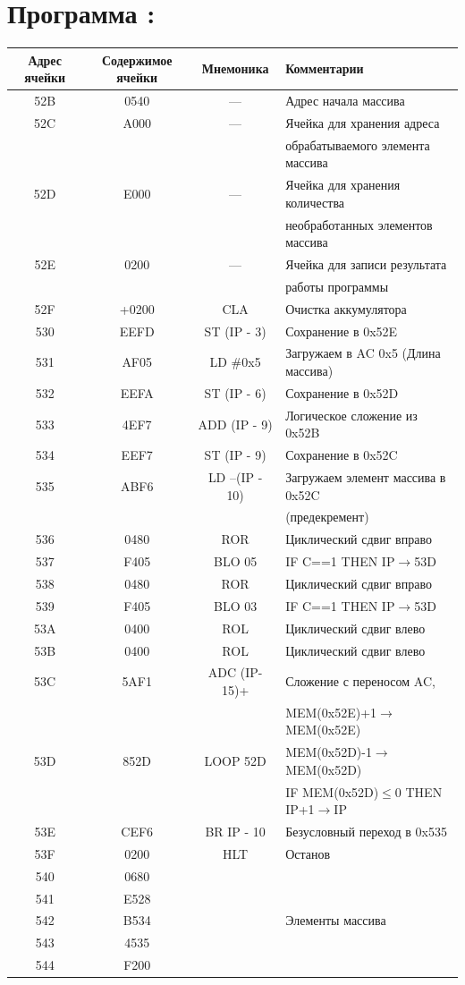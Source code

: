 \section{\textbf{\Large{Программа :}}}
\begin{center}
\begin{tabular}{|c|c|c|l|}
\hline
\textbf{Адрес ячейки} & \textbf{Содержимое ячейки} & \textbf{Мнемоника} & \textbf{Комментарии} \\
\hline
52B & 0540 & --- & Адрес начала массива \\
\hline
52C	& A000 & --- & Ячейка для хранения адреса \\
 & & & обрабатываемого элемента массива \\
\hline
52D	& E000 & --- & Ячейка для хранения количества \\
 & & &необработанных элементов массива \\
\hline
52E	& 0200 & --- & Ячейка для записи результата  \\ 
& & & работы программы \\
\hline
52F & +0200 & CLA & Очистка аккумулятора \\
\hline
530	& EEFD & ST (IP - 3) &  Сохранение в 0x52E \\
\hline
531 & AF05 & LD \#0x5 & Загружаем в AC 0x5 (Длина массива) \\
\hline
532 & EEFA & ST (IP - 6) & Сохранение в 0x52D \\
\hline
533 & 4EF7 & ADD (IP - 9) & Логическое сложение из 0x52B \\
\hline
534	& EEF7 & ST (IP - 9) & Сохранение в 0x52C \\
\hline
535 & ABF6 & LD –(IP - 10) & Загружаем элемент массива в 0x52C\\
& & &  (предекремент) \\
536 & 0480 & ROR & Циклический сдвиг вправо  \\
537	& F405 & BLO 05 & IF C==1 THEN IP$\rightarrow$53D \\
538 & 0480 & ROR & Циклический сдвиг вправо  \\
539	& F405 & BLO 03 & IF C==1 THEN IP$\rightarrow$53D \\
53A & 0400 & ROL & Циклический сдвиг влево \\
53B & 0400 & ROL & Циклический сдвиг влево \\
53C & 5AF1 & ADC (IP-15)+ &  Сложение с переносом AC, \\
& & & MEM(0x52E)+1$\rightarrow$MEM(0x52E)\\
53D & 852D & LOOP 52D & MEM(0x52D)-1$\rightarrow$ MEM(0x52D) \\
& & & IF MEM(0x52D)$\leq$0 THEN IP+1$\rightarrow$IP \\
53E & CEF6 & BR  IP - 10 & Безусловный переход в 0x535 \\
53F & 0200 & HLT & Останов \\
\hline 
540 & 0680 & & \\
541	& E528 & & \\
542	& B534 & & Элементы массива \\
543	& 4535 & & \\
544	& F200 & & \\
\hline
\end{tabular}
\end{center}
